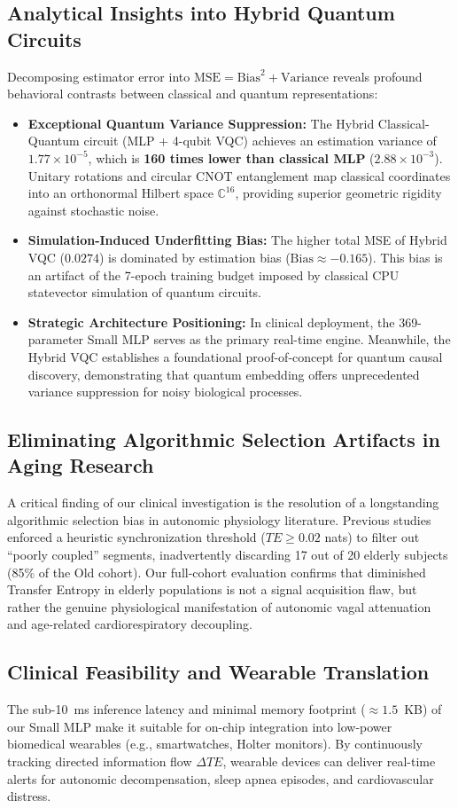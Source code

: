 \subsection{Analytical Insights into Hybrid Quantum Circuits}
Decomposing estimator error into $\mathrm{MSE} = \mathrm{Bias}^2 + \mathrm{Variance}$ reveals profound behavioral contrasts between classical and quantum representations:
\begin{itemize}
    \item \textbf{Exceptional Quantum Variance Suppression:} The Hybrid Classical-Quantum circuit (MLP + 4-qubit VQC) achieves an estimation variance of \textbf{$1.77 \times 10^{-5}$}, which is \textbf{160 times lower than classical MLP} ($2.88 \times 10^{-3}$). Unitary rotations and circular CNOT entanglement map classical coordinates into an orthonormal Hilbert space $\mathbb{C}^{16}$, providing superior geometric rigidity against stochastic noise.
    \item \textbf{Simulation-Induced Underfitting Bias:} The higher total MSE of Hybrid VQC ($0.0274$) is dominated by estimation bias ($\text{Bias} \approx -0.165$). This bias is an artifact of the 7-epoch training budget imposed by classical CPU statevector simulation of quantum circuits.
    \item \textbf{Strategic Architecture Positioning:} In clinical deployment, the 369-parameter Small MLP serves as the primary real-time engine. Meanwhile, the Hybrid VQC establishes a foundational proof-of-concept for quantum causal discovery, demonstrating that quantum embedding offers unprecedented variance suppression for noisy biological processes.
\end{itemize}

\subsection{Eliminating Algorithmic Selection Artifacts in Aging Research}
A critical finding of our clinical investigation is the resolution of a longstanding algorithmic selection bias in autonomic physiology literature. Previous studies enforced a heuristic synchronization threshold ($TE \ge 0.02$ nats) to filter out ``poorly coupled'' segments, inadvertently discarding 17 out of 20 elderly subjects (85\% of the Old cohort). Our full-cohort evaluation confirms that diminished Transfer Entropy in elderly populations is not a signal acquisition flaw, but rather the genuine physiological manifestation of autonomic vagal attenuation and age-related cardiorespiratory decoupling.

\subsection{Clinical Feasibility and Wearable Translation}
The sub-10~ms inference latency and minimal memory footprint ($\approx 1.5$~KB) of our Small MLP make it suitable for on-chip integration into low-power biomedical wearables (e.g., smartwatches, Holter monitors). By continuously tracking directed information flow $\Delta TE$, wearable devices can deliver real-time alerts for autonomic decompensation, sleep apnea episodes, and cardiovascular distress.
